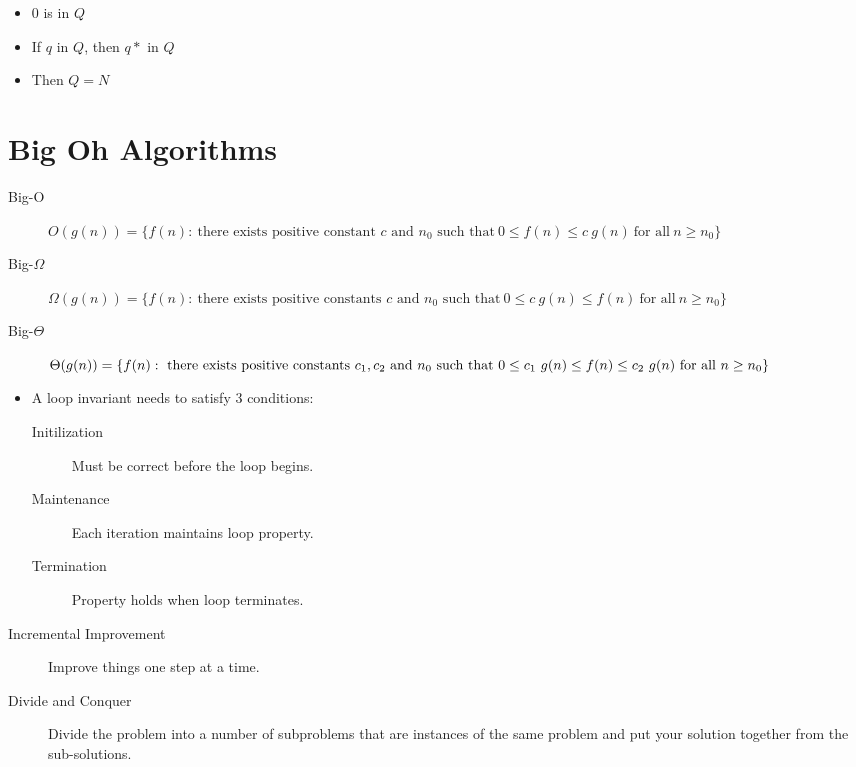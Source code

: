 \documentclass[12pt]{scrartcl}
\begin{document}
\begin{itemize}
\begin{enumerate}
                \begin{itemize}
                    \item $0$ is in $Q$
                    \item If $q$ in $Q$, then $q*$ in $Q$
                    \item Then $Q = N$
                \end{itemize}
        \end{enumerate}
\end{itemize}

\section{Big Oh Algorithms}
\begin{description}
    \item[Big-O] $O(g(n)) = \{ f(n) : \ \text{there exists positive constant $c$ and $n_0$ such that} \ 0 \leq f(n) \leq c \ g(n) \ \text{for all} \ n \geq n_0 \}$
    \item[Big-$\Omega$] $\Omega(g(n)) = \{ f(n) : \ \text{there exists positive constants $c$ and $n_0$ such that} \ 0 \leq c \ g(n) \leq f(n) \ \text{for all} \ n \geq n_0 \}$
    \item[Big-$\Theta$] $\Theta(g(n)) = \{ f(n) : \ \text{there exists positive constants $c_1, c_2$ and $n_0$ such that} \\ \ 0 \leq c_1 \ g(n) \leq f(n) \leq c_2\ g(n) \ \text{for all} \ n \geq n_0 \}$
\end{description}

\begin{itemize}
    \item A loop invariant needs to satisfy $3$ conditions:

        \begin{description}
            \item[Initilization] Must be correct before the loop begins.
            \item[Maintenance] Each iteration maintains loop property.
            \item[Termination] Property holds when loop terminates.
        \end{description}
\end{itemize}

\begin{description}
    \item[Incremental Improvement] Improve things one step at a time.
    \item[Divide and Conquer] Divide the problem into a number of subproblems that are instances of the same problem and put your solution together from the sub-solutions.
\end{description}
\end{document}

